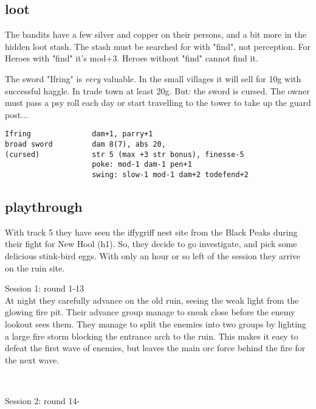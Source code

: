 \subsection*{loot}

The bandits have a few silver and copper on their persons, and a bit more in the hidden loot stash. The stash must be searched for with "find", not perception. For Heroes with "find" it's mod+3. Heroes without "find" cannot find it.

The sword "Ifring" is \emph{very} valuable. In the small villages it will sell for 10g with successful haggle. In trade town at least 20g. But: the sword is cursed. The owner must pass a psy roll each day or start travelling to the tower to take up the guard post...
\goodbreak \begin{samepage} \small \begin{verbatim}
Ifring              dam+1, parry+1
broad sword         dam 8(7), abs 20,
(cursed)            str 5 (max +3 str bonus), finesse-5
                    poke: mod-1 dam-1 pen+1
                    swing: slow-1 mod-1 dam+2 todefend+2
\end{verbatim} \normalsize \end{samepage}



\subsection*{playthrough}

With track 5 they have seen the iffygriff nest site from the Black Peaks during their fight for New Hool (h1). So, they decide to go investigate, and pick some delicious stink-bird eggs. With only an hour or so left of the session they arrive on the ruin site.

Session 1: round 1-13 \\
At night they carefully advance on the old ruin, seeing the weak light from the glowing fire pit. Their advance group manage to sneak close before the enemy lookout sees them. They manage to split the enemies into two groups by lighting a large fire storm blocking the entrance arch to the ruin. This makes it easy to defeat the first wave of enemies, but leaves the main orc force behind the fire for the next wave.

\

Session 2: round 14-







